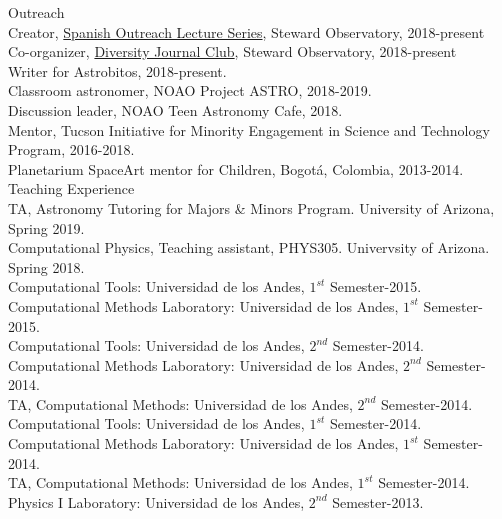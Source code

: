 \documentclass[UTF8]{article}
\begin{document}
{\Large Outreach}\\

\indent\indent Creator, \href{https://astrocharlas.github.io/}{Spanish Outreach Lecture Series}, Steward Observatory, 2018-present\\
\indent\indent Co-organizer, \href{https://www.as.arizona.edu/diversity_coffee/}{Diversity Journal Club}, Steward Observatory, 2018-present\\
\indent\indent Writer for Astrobitos, 2018-present.\\ 
\indent\indent Classroom astronomer, NOAO Project ASTRO, 2018-2019.\\
\indent\indent Discussion leader, NOAO Teen Astronomy Cafe, 2018.\\
\indent\indent Mentor, Tucson Initiative for Minority Engagement in Science and Technology Program, 2016-2018.\\
\indent\indent Planetarium SpaceArt mentor for Children, Bogot\'a, Colombia, 2013-2014.\\


{\Large Teaching Experience}\\

\indent\indent TA, Astronomy Tutoring for
Majors \& Minors Program. University of Arizona, Spring 2019. \\
\indent\indent Computational Physics, Teaching assistant, PHYS305. Univervsity of Arizona. Spring 2018.\\
\indent\indent Computational Tools: Universidad de los Andes, $1^{st}$ Semester-2015.\\
\indent\indent Computational Methods Laboratory: Universidad de los Andes, $1^{st}$ Semester-2015.\\
\indent\indent Computational Tools: Universidad de los Andes, $2^{nd}$ Semester-2014.\\
\indent\indent Computational Methods Laboratory: Universidad de los Andes, $2^{nd}$ Semester-2014.\\
\indent\indent TA, Computational Methods: Universidad de los Andes, $2^{nd}$ Semester-2014.\\
\indent\indent Computational Tools: Universidad de los Andes, $1^{st}$ Semester-2014.\\
\indent\indent Computational Methods Laboratory: Universidad de los Andes, $1^{st}$ Semester-2014.\\
\indent\indent TA, Computational Methods: Universidad de los Andes, $1^{st}$ Semester-2014.\\
\indent\indent Physics I Laboratory: Universidad de los Andes, $2^{nd}$ Semester-2013.\\
\end{document}
